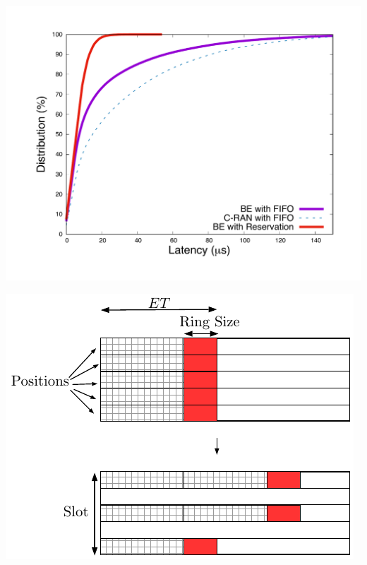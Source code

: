 \documentclass[]{algotel}
\begin{document}
 

  \begin{minipage}[b]{0.4\linewidth}
\centering
      \includegraphics[scale=0.25]{optim.pdf}
        \label{fig:optimres}
  \end{minipage} 
     \begin{minipage}[b]{0.3\linewidth}
        \begin{center}
      \includegraphics[scale=0.55]{repart2}
            \vspace{0.5cm}
          \label{fig:repart1}
      \end{center} 
  \end{minipage}
\end{document}
